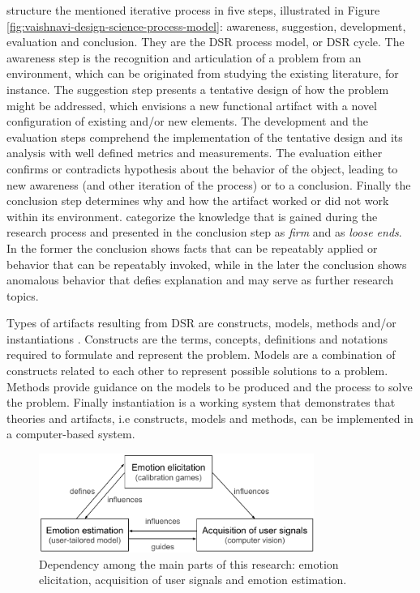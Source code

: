 \textcite{vaishnavi2015design} structure the mentioned iterative process in five steps, illustrated in Figure \ref{fig:vaishnavi-design-science-process-model}: awareness, suggestion, development, evaluation and conclusion. They are the DSR process model, or DSR cycle. The awareness step is the recognition and articulation of a problem from an environment, which can be originated from studying the existing literature, for instance. The suggestion step presents a tentative design of how the problem might be addressed, which envisions a new functional artifact with a novel configuration of existing and/or new elements. The development and the evaluation steps comprehend the implementation of the tentative design and its analysis with well defined metrics and measurements. The evaluation either confirms or contradicts hypothesis about the behavior of the object, leading to new awareness (and other iteration of the process) or to a conclusion. Finally the conclusion step determines why and how the artifact worked or did not work within its environment. \textcite{vaishnavi2015design} categorize the knowledge that is gained during the research process and presented in the conclusion step as \textit{firm} and as \textit{loose ends}. In the former the conclusion shows facts that can be repeatably applied or behavior that can be repeatably invoked, while in the later the conclusion shows anomalous behavior that defies explanation and may serve as further research topics.

Types of artifacts resulting from DSR are constructs, models, methods and/or instantiations \parencite{oates2005researching,johannesson2014introduction}. Constructs are the terms, concepts, definitions and notations required to formulate and represent the problem. Models are a combination of constructs related to each other to represent possible solutions to a problem. Methods provide guidance on the models to be produced and the process to solve the problem. Finally instantiation is a working system that demonstrates that theories and artifacts, i.e constructs, models and methods, can be implemented in a computer-based system.

\begin{figure}[h]
    \centering
    \includegraphics[width=0.8\textwidth]{Content/figures/method-components-dependency}
    \caption{Dependency among the main parts of this research: emotion elicitation, acquisition of user signals and emotion estimation.}
    \label{fig:method-components-dependency}
\end{figure}

